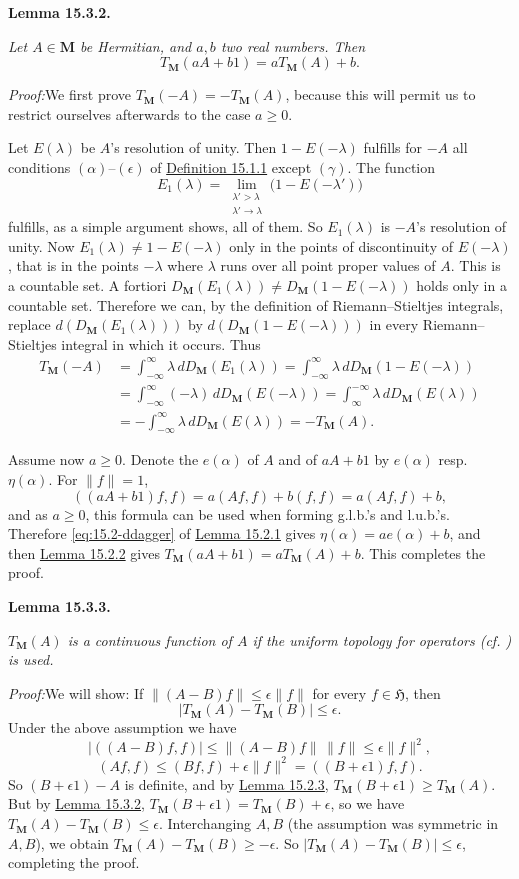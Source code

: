 \documentclass[12pt,b5paper,twoside]{article}
\newcommand{\Hspace}{\mathfrak H}
\newcommand{\M}{\mathbf M}
\newcommand{\Lemma}[1]{%
  \par\smallskip\noindent\phantomsection\label{lem:#1}\textbf{Lemma #1.}\enspace
}
\newcommand{\Proof}{\par\noindent\textit{Proof:}\enspace}
\newcommand{\defref}[1]{\hyperref[def:#1]{Definition #1}}
\newcommand{\lemref}[1]{\hyperref[lem:#1]{Lemma #1}}
\begin{document}
\Lemma{15.3.2}
{\itshape Let \(A\in\M\) be Hermitian, and \(a,b\) two real numbers. Then
\[
T_{\M}(aA+b1)=aT_{\M}(A)+b.
\]}

\Proof We first prove \(T_{\M}(-A)=-T_{\M}(A)\), because this will permit
us to restrict ourselves afterwards to the case \(a\geq0\).

Let \(E(\lambda)\) be \(A\)'s resolution of unity. Then
\(1-E(-\lambda)\) fulfills for \(-A\) all conditions
\((\alpha)\)--\((\epsilon)\) of \defref{15.1.1} except \((\gamma)\). The
function
\[
E_1(\lambda)=
\lim_{\substack{\lambda'>\lambda\\\lambda'\to\lambda}}
\bigl(1-E(-\lambda')\bigr)
\]
fulfills, as a simple argument shows, all of them. So \(E_1(\lambda)\) is
\(-A\)'s resolution of unity. Now \(E_1(\lambda)\ne1-E(-\lambda)\) only in
the points of discontinuity of \(E(-\lambda)\), that is in the points
\(-\lambda\) where \(\lambda\) runs over all point proper values of \(A\).
This is a countable set. A fortiori
\(D_{\M}(E_1(\lambda))\ne D_{\M}(1-E(-\lambda))\) holds only in a countable
set. Therefore we can, by the definition of Riemann--Stieltjes integrals,
replace \(d(D_{\M}(E_1(\lambda)))\) by
\(d(D_{\M}(1-E(-\lambda)))\) in every Riemann--Stieltjes integral in which
it occurs. Thus
\[
\begin{aligned}
T_{\M}(-A)
 &=\int_{-\infty}^{\infty}\lambda\,dD_{\M}(E_1(\lambda))
  =\int_{-\infty}^{\infty}\lambda\,dD_{\M}(1-E(-\lambda))\\
 &=\int_{-\infty}^{\infty}(-\lambda)\,dD_{\M}(E(-\lambda))
  =\int_{\infty}^{-\infty}\lambda\,dD_{\M}(E(\lambda))\\
 &=-\int_{-\infty}^{\infty}\lambda\,dD_{\M}(E(\lambda))
  =-T_{\M}(A).
\end{aligned}
\]

Assume now \(a\geq0\). Denote the \(e(\alpha)\) of \(A\) and of
\(aA+b1\) by \(e(\alpha)\) resp. \(\eta(\alpha)\). For
\(\lVert f\rVert=1\),
\[
((aA+b1)f,f)=a(Af,f)+b(f,f)=a(Af,f)+b,
\]
and as \(a\geq0\), this formula can be used when forming g.l.b.'s and
l.u.b.'s. Therefore \eqref{eq:15.2-ddagger} of \lemref{15.2.1} gives
\(\eta(\alpha)=ae(\alpha)+b\), and then \lemref{15.2.2} gives
\(T_{\M}(aA+b1)=aT_{\M}(A)+b\). This completes the proof.

\Lemma{15.3.3}
{\itshape \(T_{\M}(A)\) is a continuous function of \(A\) if the uniform
topology for operators (cf. \cite[p.~384]{ref18}) is used.}

\Proof We will show: If \(\lVert(A-B)f\rVert\leq\epsilon\lVert f\rVert\)
for every \(f\in\Hspace\), then
\[
|T_{\M}(A)-T_{\M}(B)|\leq\epsilon.
\]
Under the above assumption we have
\[
|((A-B)f,f)|\leq\lVert(A-B)f\rVert\,\lVert f\rVert
\leq\epsilon\lVert f\rVert^2,
\]
\[
(Af,f)\leq(Bf,f)+\epsilon\lVert f\rVert^2=((B+\epsilon1)f,f).
\]
So \((B+\epsilon1)-A\) is definite, and by \lemref{15.2.3},
\(T_{\M}(B+\epsilon1)\geq T_{\M}(A)\). But by \lemref{15.3.2},
\(T_{\M}(B+\epsilon1)=T_{\M}(B)+\epsilon\), so we have
\(T_{\M}(A)-T_{\M}(B)\leq\epsilon\). Interchanging \(A,B\) (the
assumption was symmetric in \(A,B\)), we obtain
\(T_{\M}(A)-T_{\M}(B)\geq-\epsilon\). So
\(|T_{\M}(A)-T_{\M}(B)|\leq\epsilon\), completing the proof.
\end{document}
